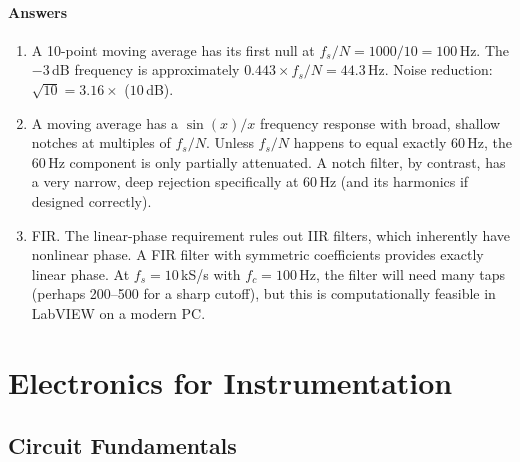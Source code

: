 \documentclass[11pt,letterpaper,twoside,openany]{book}
\begin{document}
\subsection{Answers}
\begin{enumerate}[leftmargin=1.5em]
\item A 10-point moving average has its first null at $f_s/N = 1000/10 = 100$\,Hz. The $-3$\,dB frequency is approximately $0.443 \times f_s/N = 44.3$\,Hz. Noise reduction: $\sqrt{10} = 3.16\times$ ($10$\,dB).
\item A moving average has a $\sin(x)/x$ frequency response with broad, shallow notches at multiples of $f_s/N$. Unless $f_s/N$ happens to equal exactly 60\,Hz, the 60\,Hz component is only partially attenuated. A notch filter, by contrast, has a very narrow, deep rejection specifically at 60\,Hz (and its harmonics if designed correctly).
\item FIR. The linear-phase requirement rules out IIR filters, which inherently have nonlinear phase. A FIR filter with symmetric coefficients provides exactly linear phase. At $f_s = 10$\,kS/s with $f_c = 100$\,Hz, the filter will need many taps (perhaps 200--500 for a sharp cutoff), but this is computationally feasible in LabVIEW on a modern PC.
\end{enumerate}


\part{Electronics for Instrumentation}

\chapter{Circuit Fundamentals}
\label{ch:circuits}
\end{document}

